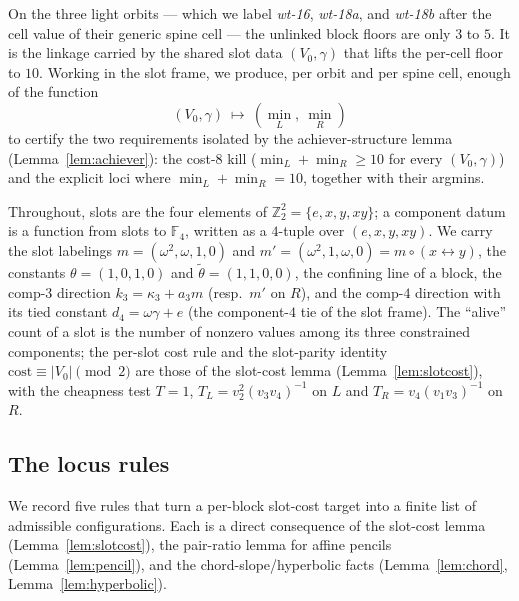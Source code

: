 \documentclass[11pt]{article}
\newcommand{\Z}{\mathbb{Z}}
\newcommand{\F}[1]{\mathbb{F}_{#1}}
\theoremstyle{plain}
\theoremstyle{definition}
\theoremstyle{remark}
\begin{document}
On the three light orbits --- which we label \emph{wt-16}, \emph{wt-18a}, and
\emph{wt-18b} after the cell value of their generic spine cell --- the unlinked block
floors are only $3$ to $5$. It is the linkage carried by the shared slot data $(V_0,\gamma)$
that lifts the per-cell floor to $10$. Working in the slot frame, we produce, per orbit and
per spine cell, enough of the function
\[
  (V_0,\gamma)\ \longmapsto\ (\min_L,\ \min_R)
\]
to certify the two requirements isolated by the achiever-structure lemma
(Lemma~\ref{lem:achiever}): the cost-$8$ kill ($\min_L+\min_R\ge 10$ for every
$(V_0,\gamma)$) and the explicit loci where $\min_L+\min_R=10$, together with their
argmins.

Throughout, slots are the four elements of $\Z_2^2=\{e,x,y,xy\}$; a component datum is a
function from slots to $\F4$, written as a $4$-tuple over $(e,x,y,xy)$. We carry the slot
labelings $m=(\omega^2,\omega,1,0)$ and $m'=(\omega^2,1,\omega,0)=m\circ(x\leftrightarrow y)$,
the constants $\theta=(1,0,1,0)$ and $\tilde\theta=(1,1,0,0)$, the confining line of a block,
the comp-$3$ direction $k_3=\kappa_{3}+a_3 m$ (resp.\ $m'$ on $R$), and the comp-$4$
direction with its tied constant $d_4=\omega\gamma+e$ (the component-$4$ tie of the slot
frame). The
``alive'' count of a slot is the number of nonzero values among its three constrained
components; the per-slot cost rule and the slot-parity identity $\text{cost}\equiv|V_0|
\pmod 2$ are those of the slot-cost lemma (Lemma~\ref{lem:slotcost}), with the cheapness
test $T=1$, $T_L=v_2^2(v_3v_4)^{-1}$ on $L$ and $T_R=v_4(v_1v_3)^{-1}$ on $R$.

\subsection{The locus rules}\label{ssec:locus-rules}

We record five rules that turn a per-block slot-cost target into a finite list of admissible
configurations. Each is a direct consequence of the slot-cost lemma
(Lemma~\ref{lem:slotcost}), the pair-ratio lemma for affine pencils (Lemma~\ref{lem:pencil}),
and the chord-slope/hyperbolic facts (Lemma~\ref{lem:chord}, Lemma~\ref{lem:hyperbolic}).
\end{document}
